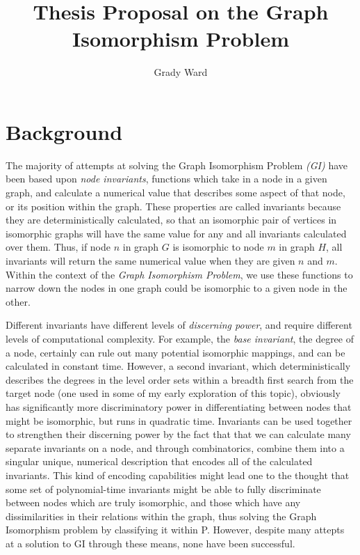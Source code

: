 \documentclass[a4paper,12pt]{article}
\begin{document}
\title{Thesis Proposal on the Graph Isomorphism Problem}
\author{Grady Ward}

\maketitle

\section*{Background}

The majority of attempts at solving the Graph Isomorphism
Problem \emph{(GI)} have been based upon \emph{node invariants}, functions
which take in a node in a given graph, and calculate a numerical
value that describes some aspect of that node, or its position within
the graph. These properties are called invariants because they are deterministically 
calculated, so that an isomorphic pair of vertices in isomorphic graphs will have the 
same value for any and all invariants calculated over them. Thus, if node \(n\) in graph \(G\)
is isomorphic to node \(m\) in graph \(H\), all invariants will return the same
numerical value when they are given \(n\) and \(m\).  Within the context of the 
\emph{Graph Isomorphism Problem}, we use these functions to narrow down the nodes 
in one graph could be isomorphic to a given node in the other. 

Different invariants have different levels of \emph{discerning power}, and require different levels of computational complexity. For example,
the \emph{base invariant}, the degree of a node, certainly can rule out many 
potential isomorphic mappings, and can be calculated in constant time.  However, a second invariant, which deterministically describes
the degrees in the level order sets within a breadth first search from the target node (one used in some of my early exploration of this topic),
obviously has significantly more discriminatory power in differentiating between nodes
that might be isomorphic, but runs in quadratic time. Invariants can be used together to strengthen their discerning power by the fact that 
that we can calculate many separate invariants on a node, and through combinatorics, combine
them into a singular unique, numerical description that encodes all of the calculated
invariants. This kind of encoding capabilities might lead one to the thought that some set of polynomial-time invariants might
be able to fully discriminate between nodes which are truly isomorphic, and those which
have any dissimilarities in their relations within the graph, thus solving the Graph Isomorphism problem by classifying it within P.
However, despite many attepts at a solution to GI through these means, none have been successful.
\end{document}
